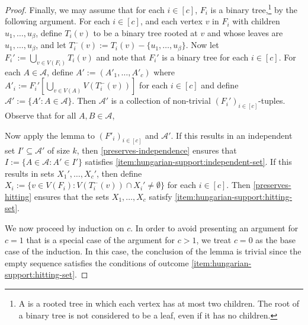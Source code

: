 \documentclass{patmorin}
\renewcommand{\mid}{:}  %
\begin{document}
\begin{proof}
  Finally, we may assume that for each $i\in[c]$, $F_i$ is a binary tree,\footnote{A  is a rooted tree in which each vertex has at most two children. The root of a binary tree is not considered to be a leaf, even if it has no children.} by the following argument.
  For each $i\in[c]$, and each vertex $v$ in $F_i$ with children $u_1,\ldots,u_\beta$, define $T_i(v)$ to be a binary tree rooted at $v$ and whose leaves are $u_1,\ldots,u_\beta$, and let $T^-_i(v):=T_i(v)-\{u_1,\ldots,u_\beta\}$.
  Now let $F_i':=\bigcup_{v\in V(F_i)} T_i(v)$ and note that $F_i'$ is a binary tree for each $i\in[c]$.
  For each $A\in\mathcal{A}$, define $A':=(A'_1,\ldots,A'_c)$ where $A'_i:=F_i'[\bigcup_{v\in V(A)} V(T^-_i(v))]$ for each $i\in [c]$ and define $\mathcal{A}':=\{A'\mid A\in\mathcal{A}\}$.  Then $\mathcal{A}'$ is a collection of non-trivial $(F_i')_{i\in[c]}$-tuples. Observe that for all $A,B\in\mathcal{A}$,
  Now apply the lemma to $(F'_i)_{i\in[c]}$ and $\mathcal{A}'$.  If this results in an independent set $I'\subseteq\mathcal{A}'$ of size $k$, then \cref{preserves-independence} ensures that $I:=\{A\in\mathcal{A}\mid A'\in I'\}$ satisfies \cref{item:hungarian-support:independent-set}.  If this results in sets $X_1',\ldots,X_c'$, then define $X_i:=\{v\in V(F_i)\mid V(T_i^-(v))\cap X_i'\neq\emptyset\}$ for each $i\in[c]$.  Then \cref{preserves-hitting} ensures that the sets $X_1,\ldots,X_c$ satisfy \cref{item:hungarian-support:hitting-set}.

  We now proceed by induction on $c$.  In order to avoid presenting an argument for $c=1$ that is a special case of the argument for $c>1$, we treat $c=0$ as the base case of the induction.  In this case, the conclusion of the lemma is trivial since the empty sequence satisfies the conditions of outcome \cref{item:hungarian-support:hitting-set}.


\end{proof}
\end{document}
